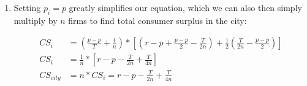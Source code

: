 \documentclass[12pt,letterpaper]{article}
\begin{document}
\begin{enumerate}
\begin{enumerate}
\item Setting $p_i = p$ greatly simplifies our equation, which we can also then simply multiply by $n$ firms to find total consumer surplus in the city:

\begin{align*}
	CS_i &= (\frac{p-p}{T} + \frac{1}{n}) * [(r - p + \frac{p - p}{2} - \frac{T}{2n}) + \frac{1}{2} (\frac{T}{2n} - \frac{p - p}{2})] \\ 
	CS_i &= \frac{1}{n} * [r - p - \frac{T}{2n} + \frac{T}{4n}] \\
	CS_{city} &= n * CS_i = r - p - \frac{T}{2n} + \frac{T}{4n}
\end{align*}
\end{enumerate}
\end{enumerate}
	
\end{document}
